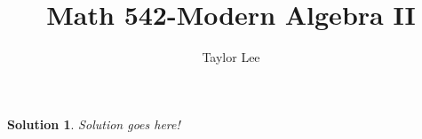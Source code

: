 \documentclass[12pt]{article}
\theoremstyle{moo}
\newtheorem*{sol}{Solution}
\begin{document}
\fontseries {\seriesdefault}
\fontshape {\shapedefault}
\selectfont

\title{ Math 542-Modern Algebra II}
\date{\usdate {}}         
\author{Taylor Lee}                          
\maketitle                      







\begin{sol}

Solution goes here!

\end{sol}
\end{document}
